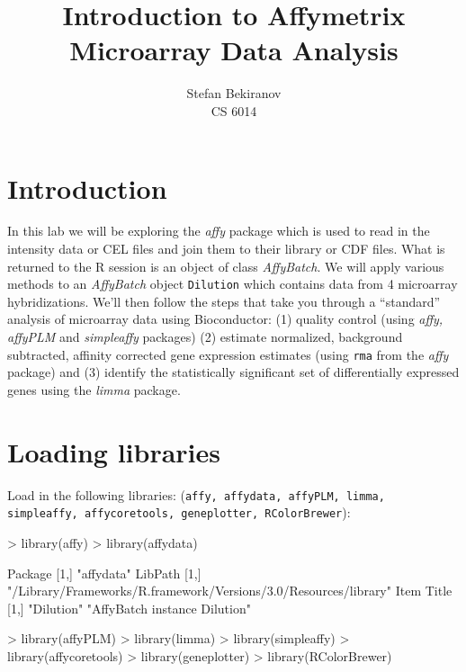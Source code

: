 \documentclass[12pt]{article}
\newcommand{\code}[1]{{\texttt{#1}}}
\begin{document}

\title{Introduction to Affymetrix Microarray Data Analysis}

\author{Stefan Bekiranov\\CS 6014}
\maketitle

\tableofcontents

\section{Introduction}

In this lab we will be exploring the {\it affy} package which is used to read in the intensity data or CEL files and join them to their library or CDF files.  What is returned to the R session is an object of class {\it AffyBatch}.  We will apply various methods to an {\it AffyBatch} object \code{Dilution} which contains data from 4 microarray hybridizations.  We'll then follow the steps that take you through a ``standard'' analysis of microarray data using Bioconductor: (1) quality control (using {\it affy, affyPLM} and {\it simpleaffy} packages) (2) estimate normalized, background subtracted, affinity corrected gene expression estimates (using \code{rma} from the {\it affy} package) and (3) identify the statistically significant set of differentially expressed genes using the {\it limma} package. 

\section{Loading libraries}

Load in the following libraries: (\code{affy, affydata, affyPLM, limma, simpleaffy, affycoretools, geneplotter, RColorBrewer}):
\begin{Schunk}
\begin{Sinput}
> library(affy)
> library(affydata)
\end{Sinput}
\begin{Soutput}
     Package   
[1,] "affydata"
     LibPath                                                         
[1,] "/Library/Frameworks/R.framework/Versions/3.0/Resources/library"
     Item       Title                        
[1,] "Dilution" "AffyBatch instance Dilution"
\end{Soutput}
\begin{Sinput}
> library(affyPLM)
> library(limma)
> library(simpleaffy)
> library(affycoretools)
> library(geneplotter)
> library(RColorBrewer)
\end{Sinput}
\end{Schunk}
\end{document}
